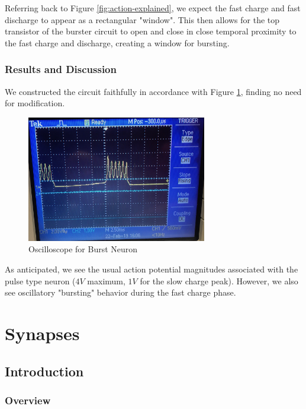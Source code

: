 \documentclass[12]{book}
\newcommand\0{\mathbf{0}}
\newcommand\<{\langle}
\renewcommand\>{\rangle}
\begin{document}
Referring back to Figure \ref{fig:action-explained}, we expect the fast charge and fast discharge to appear as a rectangular "window". This then allows for the top transistor of the burster circuit to open and close in close temporal proximity to the fast charge and discharge, creating a window for bursting.

\subsection{Results and Discussion}

We constructed the circuit faithfully in accordance with Figure \ref{fig:maeda-burst}, finding no need for modification.

\begin{figure}[h]
\centering
\includegraphics[width=0.7\textwidth]{burster_osc}
\caption{Oscilloscope for Burst Neuron}
\label{fig:maeda-burst}
\end{figure}

As anticipated, we see the usual action potential magnitudes associated with the pulse type neuron ($4V$ maximum, $1V$ for the slow charge peak). However, we also see oscillatory "bursting" behavior during the fast charge phase.

\chapter{Synapses}

\section{Introduction}

\subsection{Overview}
\end{document}
